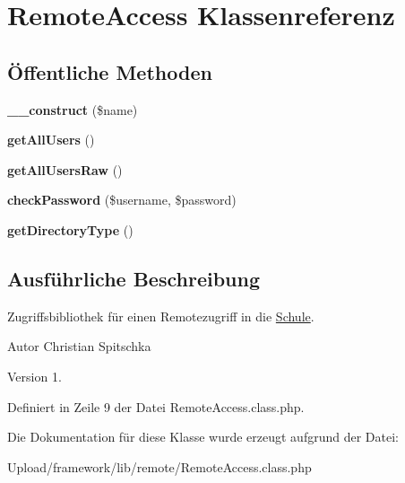 \hypertarget{class_remote_access}{}\section{Remote\+Access Klassenreferenz}
\label{class_remote_access}
\subsection*{Öffentliche Methoden}
\begin{DoxyCompactItemize}
\item 
\mbox{\label{class_remote_access_a9876ce81408098934d188031b9f886d8}} 
{\bfseries \+\_\+\+\_\+construct} (\$name)
\item 
\mbox{\label{class_remote_access_a203d71f53bf54155b419c002a6bd3c3b}} 
{\bfseries get\+All\+Users} ()
\item 
\mbox{\label{class_remote_access_a03afb35ce5d27afd369b64151a799b82}} 
{\bfseries get\+All\+Users\+Raw} ()
\item 
\mbox{\label{class_remote_access_a4fdbe9c62adacaf366100b02672627de}} 
{\bfseries check\+Password} (\$username, \$password)
\item 
\mbox{\label{class_remote_access_a84ffeeb9014e37ea4a33c8e59bc19d52}} 
{\bfseries get\+Directory\+Type} ()
\end{DoxyCompactItemize}


\subsection{Ausführliche Beschreibung}
Zugriffsbibliothek für einen Remotezugriff in die \mbox{\hyperlink{class_schule}{Schule}}. \begin{DoxyAuthor}{Autor}
Christian Spitschka 
\end{DoxyAuthor}
\begin{DoxyVersion}{Version}
1. 
\end{DoxyVersion}


Definiert in Zeile 9 der Datei Remote\+Access.\+class.\+php.



Die Dokumentation für diese Klasse wurde erzeugt aufgrund der Datei\+:\begin{DoxyCompactItemize}
\item 
Upload/framework/lib/remote/Remote\+Access.\+class.\+php\end{DoxyCompactItemize}
